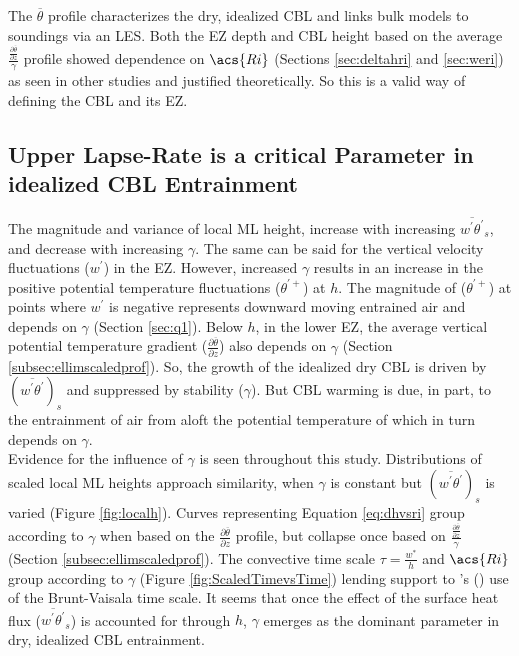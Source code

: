 The $\overline{\theta}$ profile characterizes the dry, idealized \acs{CBL} and links bulk models to soundings via an \acs{LES}.  Both the \acs{EZ} depth and \acs{CBL} height based on the average $\frac{\frac{\partial \overline{\theta}}{\partial z}}{\gamma}$ profile showed dependence on $\acs{Ri}$ (Sections \ref{sec:deltahri} and \ref{sec:weri}) as seen in other studies and justified theoretically.  So this is a valid way of defining the \acs{CBL} and its \acs{EZ}.  

\subsection{Upper Lapse-Rate is a critical Parameter in idealized \acs{CBL} Entrainment}

The magnitude and variance of local \acs{ML} height, increase with increasing $\overline{w^{'}\theta^{'}}_{s}$, and decrease with increasing $\gamma$.  The same can be said for the vertical velocity fluctuations ($w^{'}$) in the \acs{EZ}.  However, increased $\gamma$ results in an increase in the positive potential temperature fluctuations ($\theta^{'+}$) at $h$. The magnitude of ($\theta^{'+}$) at points where $w^{'}$ is negative represents downward moving entrained air and depends on $\gamma$ (Section \ref{sec:q1}).  Below $h$, in the lower \acs{EZ}, the average vertical potential temperature gradient ($\frac{\partial \overline{\theta}}{\partial z}$) also depends on $\gamma$ (Section \ref{subsec:ellimscaledprof}). So, the growth of the idealized dry \acs{CBL} is driven by $(\overline{w^{'}\theta^{'}})_{s}$ and suppressed by stability ($\gamma$). But \acs{CBL} warming is due, in part, to the entrainment of air from aloft the potential temperature of which in turn depends on $\gamma$.\\

Evidence for the influence of $\gamma$ is seen throughout this study.  Distributions of scaled local \acs{ML} heights approach similarity, when $\gamma$ is constant but $(\overline{w^{'}\theta^{'}})_{s}$ is varied (Figure \ref{fig:localh}).  Curves representing Equation \ref{eq:dhvsri} group according to $\gamma$ when based on the $\frac{\partial \overline{\theta}}{\partial z}$ profile, but collapse once based on $\frac{\frac{\partial \overline{\theta}}{\partial z}}{\gamma}$ (Section \ref{subsec:ellimscaledprof}).  The convective time scale $\tau = \frac{w^{*}}{h}$ and $\acs{Ri}$ group according to $\gamma$ (Figure \ref{fig:ScaledTimevsTime}) lending support to \citeauthor{FedConzMir04}'s (\citeyear{FedConzMir04}) use of the Brunt-Vaisala time scale.  It seems that once the effect of the surface heat flux ($\overline{w^{'}\theta^{'}}_{s}$) is accounted for through $h$, $\gamma$ emerges as the dominant parameter in dry, idealized \acs{CBL} entrainment.\\ 

